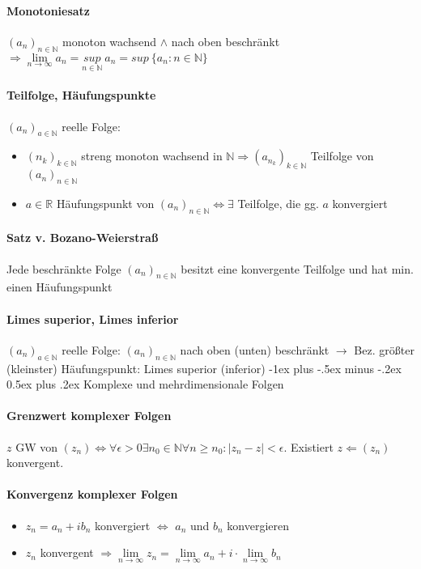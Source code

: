 \documentclass[paper=a4,paper=landscape, fontsize=6pt,DIV=25, twoside]{scrartcl}
\makeatletter
\newcommand{\real}{{\mathbb{R}}}
\newcommand{\nat}{\mathbb{N}}
\newcommand{\aseq}{(a_n)_{n \in \nat}}
\renewcommand{\section}{\@startsection{section}{1}{0mm}%
                                {-1ex plus -.5ex minus -.2ex}%
                                {0.5ex plus .2ex}%
                                {\normalfont\large\bfseries}}
\makeatother
\begin{document}
\begin{multicols*}{4}
		\paragraph{Monotoniesatz}
			$\aseq$ monoton wachsend $\wedge$ nach oben beschränkt $\Rightarrow \lim\limits_{n \rightarrow \infty} a_n = \underset{n \in \nat}{sup}\:a_n = sup\:\{a_n:n \in \nat\}$
		\paragraph{Teilfolge, Häufungspunkte}
			$(a_n)_{a \in \nat}$ reelle Folge:
			\begin{itemize}[noitemsep,nolistsep]
			\item $(n_k)_{k \in \nat}$ streng monoton wachsend in $\nat \Rightarrow (a_{n_k})_{k \in \nat}$ Teilfolge von $\aseq$
			\item $a \in \real$ Häufungspunkt von $\aseq \Leftrightarrow \exists$ Teilfolge, die gg. $a$ konvergiert
			\end{itemize}
		\paragraph{Satz v. Bozano-Weierstraß}
		Jede beschränkte Folge $\aseq$ besitzt eine konvergente Teilfolge und hat min. einen Häufungspunkt
		\paragraph{Limes superior, Limes inferior}
		$(a_n)_{a \in \nat}$ reelle Folge: $\aseq$ nach oben (unten) beschränkt $\rightarrow$ Bez. größter (kleinster) Häufungspunkt: Limes superior (inferior)
	\section{Komplexe und mehrdimensionale Folgen}
		\paragraph{Grenzwert komplexer Folgen}
		$z$ GW von $(z_n) \Leftrightarrow \forall \epsilon > 0 \exists n_0 \in \nat \forall n \geq n_0: |z_n - z| < \epsilon$. Existiert $z \Leftarrow (z_n)$ konvergent.
		\paragraph{Konvergenz komplexer Folgen}
		\begin{itemize}[noitemsep,nolistsep]
			\item $z_n = a_n + ib_n$ konvergiert $\Leftrightarrow$ $a_n$ und $b_n$ konvergieren
			\item $z_n$ konvergent $\Rightarrow \lim\limits_{n \rightarrow \infty} z_n = \lim\limits_{n \rightarrow \infty} a_n + i \cdot \lim\limits_{n \rightarrow \infty} b_n$
		\end{itemize}

\end{multicols*}
\end{document}
